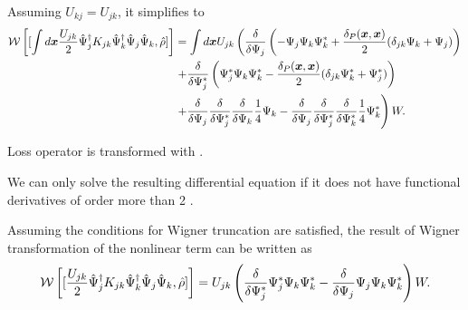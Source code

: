 Assuming $U_{kj} = U_{jk}$, it simplifies to
\begin{equation*}
\begin{split}
	\mathcal{W} \left[
		[
			\int d\boldsymbol{x} \frac{U_{jk}}{2}
				\hat{\Psi}_j^\dagger K_{jk} \hat{\Psi}_k^\dagger \hat{\Psi}_j \hat{\Psi}_k,
			\hat{\rho}
		]
	\right]
	& = \int d\boldsymbol{x} U_{jk} \left(
		\frac{\delta}{\delta \Psi_j} \left(
			- \Psi_j \Psi_k \Psi_k^*
			+ \frac{\delta_P(\boldsymbol{x}, \boldsymbol{x})}{2} ( \delta_{jk} \Psi_k + \Psi_j )
		\right) \right. \\
	&	\left. + \frac{\delta}{\delta \Psi_j^*} \left(
			\Psi_j^* \Psi_k \Psi_k^*
			- \frac{\delta_P(\boldsymbol{x}, \boldsymbol{x})}{2} ( \delta_{jk} \Psi_k^* + \Psi_j^* )
		\right) \right. \\
	&	\left.
			+ \frac{\delta}{\delta \Psi_j}
			\frac{\delta}{\delta \Psi_j^*}
			\frac{\delta}{\delta \Psi_k}
			\frac{1}{4} \Psi_k
			- \frac{\delta}{\delta \Psi_j}
			\frac{\delta}{\delta \Psi_j^*}
			\frac{\delta}{\delta \Psi_k^*}
			\frac{1}{4} \Psi_k^*
		\right) W.
\end{split}
\end{equation*}

Loss operator is transformed with .

We can only solve the resulting differential equation if it does not have functional derivatives of order more than 2 .

\begin{lemma}
Assuming the conditions for Wigner truncation are satisfied,
the result of Wigner transformation of the nonlinear term can be written as
\[
	\mathcal{W} \left[
		[
			\frac{U_{jk}}{2}
				\hat{\Psi}_j^\dagger K_{jk} \hat{\Psi}_k^\dagger \hat{\Psi}_j \hat{\Psi}_k,
			\hat{\rho}
		]
	\right]
	= U_{jk} \left(
		\frac{\delta}{\delta \Psi_j^*} \Psi_j^* \Psi_k \Psi_k^*
		- \frac{\delta}{\delta \Psi_j} \Psi_j \Psi_k \Psi_k^*
	\right) W.
\]
\end{lemma}


